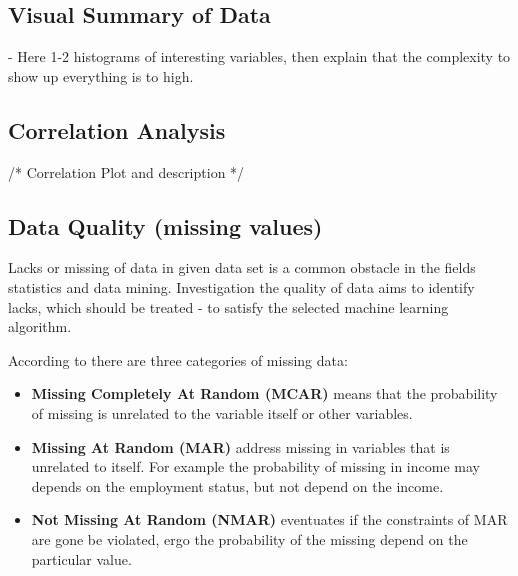 \subsection{Visual Summary of Data}\label{Ch:2:VSummary} 

- Here  1-2 histograms of interesting variables, then explain that the complexity to show up everything is to high.

\subsection{Correlation Analysis}\label{Ch:2:CorAn}  /* Correlation Plot and description */

\subsection{Data Quality (missing values)}\label{Ch:2:DataQuality}
Lacks or missing of data in given data set is a common obstacle in the fields statistics and data mining. Investigation the quality of data aims to identify lacks, which should be treated - to satisfy the selected machine learning algorithm. 

According to \cite{Allison:2007} there are three categories of missing data:

 \begin{itemize}
    \item \textbf{Missing Completely At Random (MCAR)} means that the probability of missing is unrelated to the variable itself or other variables. 
    \item \textbf{Missing At Random (MAR)} address missing in variables that is unrelated to itself. For example the probability of missing in income may depends on the employment status, but not depend on the income.
    \item \textbf{Not Missing At Random (NMAR)} eventuates if the constraints of MAR are gone be violated, ergo the probability of the missing depend on the particular value.
 \end{itemize} 
 

